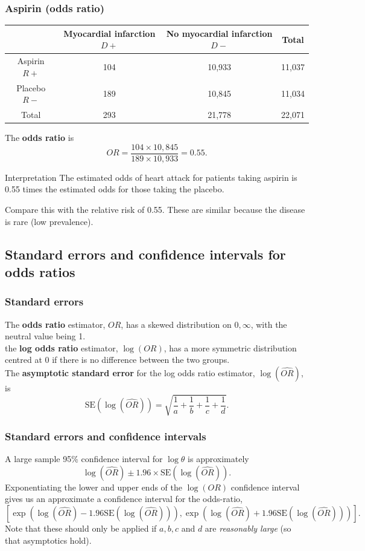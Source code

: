 \documentclass[a4paper]{article}
\begin{document}
\subsubsection{Aspirin (odds ratio)}
\begin{table}[H]
	\centering
	\begin{tabular}{@{}cccc@{}}
	\toprule
		             & Myocardial infarction \( D+ \)  & No myocardial infarction \( D- \)  & Total \\ \midrule
	Aspirin \( R+ \) & 104	                           & 10,933                             & 11,037 \\
	Placebo \( R- \) & 189                            & 10,845                            & 11,034 \\
	Total            & 293                             & 21,778	                            & 22,071 \\ \bottomrule
	\end{tabular}
\end{table}
The \textbf{odds ratio} is
\[
	OR = \frac{104 \times 10,845}{189\times 10,933} = 0.55.
\]
\begin{bluebox}{Interpretation}
	The estimated odds of heart attack for patients taking aspirin is 0.55 times the estimated odds for those taking the placebo.
\end{bluebox}
Compare this with the relative risk of 0.55. These are similar because the disease is rare (low prevalence).
\subsection{Standard errors and confidence intervals for odds ratios}
\subsubsection{Standard errors}
The \textbf{odds ratio} estimator, \( OR \), has a skewed distribution on \( 0,\infty \), with the neutral value being 1.\\
the \textbf{log odds ratio} estimator, \( \log(OR) \), has a more symmetric distribution centred at 0 if there is no difference between the two groups.\\
The \textbf{asymptotic standard error} for the log odds ratio estimator, \( \log(\widehat{OR}) \), is
\[
	\mathrm{SE}(\log(\widehat{OR})) = \sqrt{\frac{1}{a} + \frac{1}{b} + \frac{1}{c} + \frac{1}{d}}.
\]
\subsubsection{Standard errors and confidence intervals}
A large sample 95\% confidence interval for \( \log \theta \) is approximately
\[
	\log(\widehat{OR}) \pm 1.96 \times \mathrm{SE}(\log(\widehat{OR})).
\]
Exponentiating the lower and upper ends of the \( \log(OR) \) confidence interval gives us an approximate a confidence interval for the odds-ratio,
\[
	\left[ \exp\left( \log(\widehat{OR}) - 1.96 \mathrm{SE}(\log(\widehat{OR})) \right), \exp\left( \log(\widehat{OR}) + 1.96\mathrm{SE}(\log(\widehat{OR})) \right) \right].
\]
Note that these should only be applied if \( a,b,c \) and \( d \) are \textit{reasonably large} (so that asymptotics hold).
\end{document}

